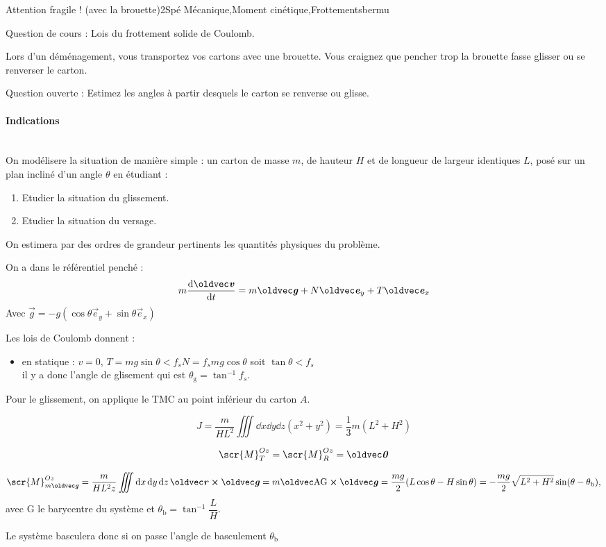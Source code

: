 \begin{exercise}{Attention fragile ! (avec la brouette)}{2}{Spé}
{Mécanique,Moment cinétique,Frottements}{bermu}


\textsf{Question de cours :} Lois du frottement solide de Coulomb.

Lors d'un déménagement, vous transportez vos cartons avec une brouette.
Vous craignez que pencher trop la brouette fasse glisser ou se renverser le carton.

\textsf{Question ouverte :} Estimez les angles à partir desquels le carton se renverse ou glisse.

\paragraph{Indications}~\\

On modélisere la situation de manière simple : un carton de masse $m$, de hauteur $H$ et de longueur de largeur identiques $L$, posé sur un plan incliné d'un angle $\theta$ en étudiant :
\begin{enumerate}
    \item Etudier la situation du glissement.
    \item Etudier la situation du versage.
\end{enumerate}

On estimera par des ordres de grandeur pertinents les quantités physiques du problème.

\end{exercise}

\begin{solution}
On a dans le référentiel penché :
    $$m\dv{\vec{v}}{t} = m\vec{g} + N\vec{e}_y + T\vec{e}_x$$
Avec $\vec{g} = -g(\cos\theta\vec{e}_y + \sin\theta\vec{e}_x)$

Les lois de Coulomb donnent :
\begin{itemize}
    \item en statique : $v = 0$, $T = m g \sin\theta < f_s N = f_s m g \cos\theta$ soit $\tan\theta < f_s$ \\
    \noindent il y a donc l'angle de glisement qui est $\theta_\text{g} = \tan^{-1}f_s$.
\end{itemize}

Pour le glissement, on applique le TMC au point inférieur du carton $A$.

$$J = \dfrac{m}{HL^2} \iiint \dd{x}\dd{y}\dd{z} (x^2+y^2) = \dfrac{1}{3}m(L^2+H^2)$$

$$\scr{M}^{Oz}_{T} = \scr{M}^{Oz}_{R} = \vec{0}$$

$$\scr{M}^{Oz}_{m\vec{g}} = \dfrac{m}{HL^2z} \iiint \dd{x}\dd{y}\dd{z} \vec{r}\cross\vg = m\vec{\text{AG}}\cross\vec{g} = \dfrac{mg}{2}(L \cos\theta - H\sin\theta) =  -\dfrac{mg}{2}\sqrt{L^2+H^2}\sin(\theta-\theta_\text{b}),$$
avec G le barycentre du système et $\theta_\text{b} = \tan^{-1}\dfrac{L}{H}$.

Le système basculera donc si on passe l'angle de basculement $\theta_\text{b}$
\end{solution}